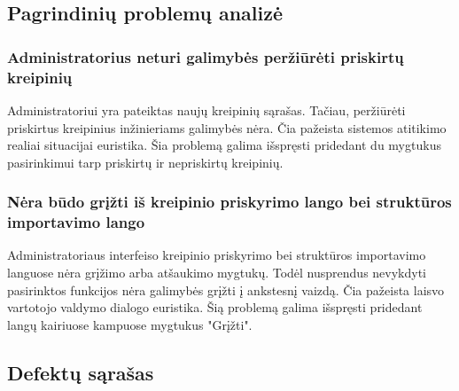\subsection{Pagrindinių problemų analizė}
	
	\subsubsection{Administratorius neturi galimybės peržiūrėti priskirtų kreipinių}
		
		Administratoriui yra pateiktas naujų kreipinių sąrašas.
		Tačiau, peržiūrėti priskirtus kreipinius inžinieriams galimybės nėra.
		Čia pažeista sistemos atitikimo realiai situacijai euristika.
		Šia problemą galima išspręsti pridedant du mygtukus pasirinkimui tarp priskirtų ir nepriskirtų kreipinių.
		
	\subsubsection{Nėra būdo grįžti iš kreipinio priskyrimo lango bei struktūros importavimo lango}
	
		Administratoriaus interfeiso kreipinio priskyrimo bei struktūros importavimo languose nėra grįžimo arba atšaukimo mygtukų.
		Todėl nusprendus nevykdyti pasirinktos funkcijos nėra galimybės grįžti į ankstesnį vaizdą.
		Čia pažeista laisvo vartotojo valdymo dialogo euristika.
		Šią problemą galima išspręsti pridedant langų kairiuose kampuose mygtukus "Grįžti".
	
\subsection{Defektų sąrašas}
	
